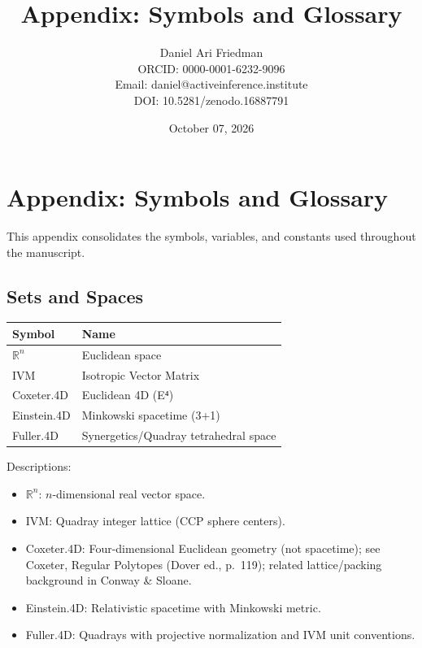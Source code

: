 \documentclass[
  10pt,
]{article}
\title{Appendix: Symbols and Glossary}
\author{Daniel Ari Friedman\\ ORCID: 0000-0001-6232-9096\\ Email: daniel@activeinference.institute\\ DOI: 10.5281/zenodo.16887791}
\date{October 07, 2026}
\newcounter{none} %
\providecommand{\tightlist}{%
  \setlength{\itemsep}{0pt}\setlength{\parskip}{0pt}}
\begin{document}
\maketitle

{
\hypersetup{linkcolor=black}
\setcounter{tocdepth}{3}
\tableofcontents
}
\section{Appendix: Symbols and
Glossary}\label{appendix-symbols-and-glossary}

This appendix consolidates the symbols, variables, and constants used
throughout the manuscript.

\subsection{Sets and Spaces}\label{sets-and-spaces}

{\def\LTcaptype{none} %
\begin{longtable}[]{@{}ll@{}}
\toprule\noalign{}
Symbol & Name \\
\midrule\noalign{}
\endhead
\bottomrule\noalign{}
\endlastfoot
\(\mathbb{R}^n\) & Euclidean space \\
IVM & Isotropic Vector Matrix \\
Coxeter.4D & Euclidean 4D (E⁴) \\
Einstein.4D & Minkowski spacetime (3+1) \\
Fuller.4D & Synergetics/Quadray tetrahedral space \\
\end{longtable}
}

Descriptions:

\begin{itemize}
\tightlist
\item
  \(\mathbb{R}^n\): \(n\)-dimensional real vector space.
\item
  IVM: Quadray integer lattice (CCP sphere centers).
\item
  Coxeter.4D: Four-dimensional Euclidean geometry (not spacetime); see
  Coxeter, Regular Polytopes (Dover ed., p.~119); related
  lattice/packing background in Conway \& Sloane.
\item
  Einstein.4D: Relativistic spacetime with Minkowski metric.
\item
  Fuller.4D: Quadrays with projective normalization and IVM unit
  conventions.
\end{itemize}
\end{document}
